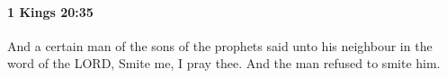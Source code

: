 
		\paragraph{1 Kings 20:35} %
			\label{1KINGS-20-35}

			And a certain man of the sons of the prophets said unto his neighbour in the word of the LORD, Smite me, I pray thee. And the man refused to smite him.


